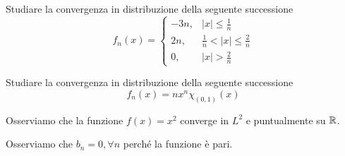 \Esercizio{}

Studiare la convergenza in distribuzione della seguente successione
\begin{equation*}
f_{n} (x) =
\begin{cases}
- 3n, & |x| \leq \frac{1}{n}\\
2n, & \frac{1}{n} < |x| \leq \frac{2}{n}\\
0, & |x| > \frac{2}{n}
\end{cases}
\end{equation*}

\Esercizio{}

Studiare la convergenza in distribuzione della seguente successione
\begin{equation*}
f_{n} (x) = nx^{n} \chi_{(0, 1)} (x)
\end{equation*}

\ParteSoluzioni

\Soluzione

Osserviamo che la funzione $f(x) = x^{2}$ converge in $L^{2}$ e puntualmente su $\mathbb{R} $.

Osserviamo che $b_{n} = 0, \forall n$ perché la funzione è pari.

